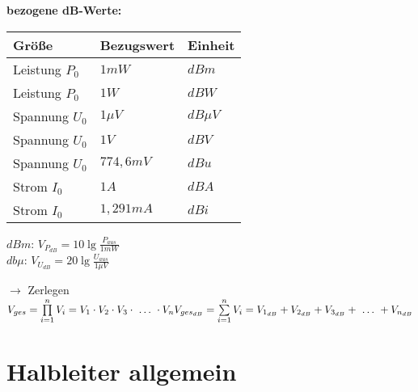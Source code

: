     \begin{minipage}{0.5\columnwidth}
    \textbf{bezogene dB-Werte:}
    \renewcommand{\arraystretch}{0.9}
    \begin{table}[H]
    \centering
    \begin{tabular}{|l|l|l|}
    \hline
    Größe                       & Bezugswert     & Einheit        \\ \hline
    Leistung $P_0$              & $1mW$          & $dBm$          \\ \hline
    Leistung $P_0$              & $1W$           & $dBW$          \\ \hline
    Spannung $U_0$              & $1\mu V$       & $dB\mu V$      \\ \hline
    Spannung $U_0$              & $1V$           & $dBV$          \\ \hline
    Spannung $U_0$              & $774,6mV$      & $dBu$          \\ \hline
    Strom $I_0$                 & $1A$           & $dBA$          \\ \hline
    Strom $I_0$                 & $1,291mA$      & $dBi$          \\ \hline
    \end{tabular}
    \end{table}
    $dBm$: $V_{P_{dB}}=10\lg\frac{P_{aus}}{1mW}$\\
    $db\mu$: $V_{U_{dB}}=20\lg\frac{U_{aus}}{1\mu V}$
    \end{minipage}

    $\longrightarrow$ Zerlegen\\
    $V_{ges}=\prod\limits_{i=1}^n V_i=V_1\cdot V_2\cdot V_3\cdot\ \dots\ \cdot V_n\\ V_{ges_{dB}}=\sum\limits_{i=1}^n V_i=V_{1_{dB}}+V_{2_{dB}}+V_{3_{dB}}+\ \dots\ +V_{n_{dB}}$\\

    \section{Halbleiter allgemein}
    \label{sec:halbleiter}

